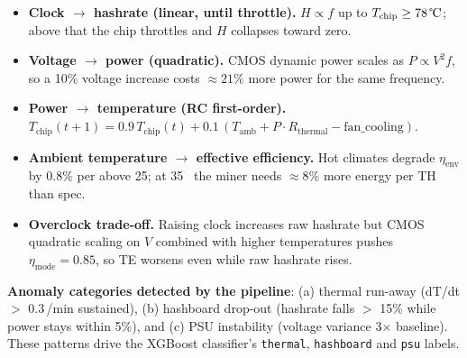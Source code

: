 \documentclass[11pt,a4paper]{article}
\begin{document}
\begin{itemize}[leftmargin=1.2em]
    \item \textbf{Clock $\rightarrow$ hashrate (linear, until throttle).}
          $H \propto f$ up to $T_{\text{chip}} \geq 78\,\text{\textcelsius}$;
          above that the chip throttles and $H$ collapses toward zero.
    \item \textbf{Voltage $\rightarrow$ power (quadratic).}
          CMOS dynamic power scales as $P \propto V^2 f$, so a 10\% voltage
          increase costs $\approx 21\%$ more power for the same frequency.
    \item \textbf{Power $\rightarrow$ temperature (RC first-order).}
          $T_{\text{chip}}(t{+}1) = 0.9\,T_{\text{chip}}(t) + 0.1\,(T_{\text{amb}}
          + P \cdot R_{\text{thermal}} - \text{fan\_cooling})$.
    \item \textbf{Ambient temperature $\rightarrow$ effective efficiency.}
          Hot climates degrade $\eta_{\text{env}}$ by $0.8\%$ per \textcelsius{}
          above 25; at 35~\textcelsius{} the miner needs $\approx 8\%$ more
          energy per TH than spec.
    \item \textbf{Overclock trade-off.} Raising clock increases raw hashrate
          but CMOS quadratic scaling on $V$ combined with higher temperatures
          pushes $\eta_{\text{mode}} = 0.85$, so TE worsens even while raw
          hashrate rises.
\end{itemize}

\textbf{Anomaly categories detected by the pipeline}:
(a) thermal run-away (dT/dt $>$ 0.3\,\textcelsius/min sustained),
(b) hashboard drop-out (hashrate falls $>$ 15\% while power stays within
5\%), and (c) PSU instability (voltage variance 3$\times$ baseline). These
patterns drive the XGBoost classifier's \texttt{thermal}, \texttt{hashboard}
and \texttt{psu} labels.
\end{document}
